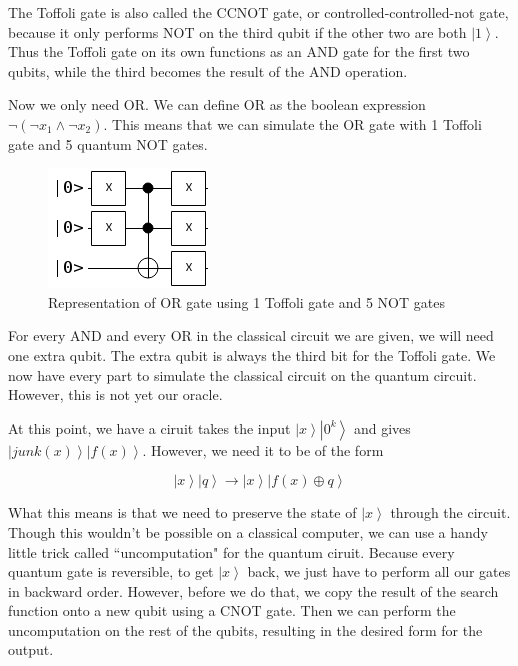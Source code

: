 \documentclass[11pt]{article}
\begin{document}
The Toffoli gate is also called the CCNOT gate, or controlled-controlled-not gate, because it only performs NOT on the third qubit if the other two are both $\left | 1 \right \rangle$. Thus the Toffoli gate on its own functions as an AND gate for the first two qubits, while the third becomes the result of the AND operation.

Now we only need OR. We can define OR as the boolean expression $\neg (\neg x_{1} \land \neg x_{2})$. This means that we can simulate the OR gate with 1 Toffoli gate and 5 quantum NOT gates.

\begin{figure}[!ht]
    \centering
    \includegraphics[scale=0.6]{OR.png}
    \caption{Representation of OR gate using 1 Toffoli gate and 5 NOT gates}
    \label{fig:awesome_image}
\end{figure} 

For every AND and every OR in the classical circuit we are given, we will need one extra qubit. The extra qubit is always the third bit for the Toffoli gate. We now have every part to simulate the classical circuit on the quantum circuit. However, this is not yet our oracle.

At this point, we have a ciruit takes the input $\left | x \right \rangle \left | 0^{k} \right \rangle$ and gives $\left | junk(x) \right \rangle \left | f(x) \right \rangle$. However, we need it to be of the form \cite{kothari12} 

$$\left | x \right \rangle \left | q \right \rangle \to \left | x \right \rangle \left | f(x) \oplus q \right \rangle$$

What this means is that we need to preserve the state of $\left | x \right \rangle$ through the circuit. Though this wouldn't be possible on a classical computer, we can use a handy little trick called ``uncomputation" for the quantum ciruit. Because every quantum gate is reversible, to get $\left | x \right \rangle$ back, we just have to perform all our gates in backward order. However, before we do that, we copy the result of the search function onto a new qubit using a CNOT gate. Then we can perform the uncomputation on the rest of the qubits, resulting in the desired form for the output.
\end{document}
